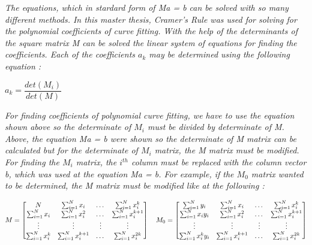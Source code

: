 \emph{\color{blue}The equations, which in stardard form of Ma = b can be solved with so many different methods. In this master thesis, \textit{Cramer's Rule} was used for solving for the polynomial coefficients of curve fitting. With the help of the determinants of the square matrix M can be solved the linear system of equations for finding the coefficients. Each of the coefficients $a_{k}$ may be determined using the following equation :}

\begin{center}
$a_{k} = \dfrac{det(M_{i})}{det(M)}$
\end{center}

\emph{\color{blue}For finding coefficients of polynomial curve fitting, we have to use the equation shown above so the determinate of $ M_{i} $ must be divided by determinate of M. Above, the equation Ma = b were shown so the determinate of M matrix can be calculated but for the determinate of $ M_{i} $ matrix, the M matrix must be modified. For finding the $ M_{i} $ matrix, the $ i^{th} $ column must be replaced with the column vector b, which was used at the equation Ma = b. For example, if the $ M_{0} $ matrix wanted to be determined, the M matrix must be modified like at the following\cite{Curve_Fitting2} :}


\[
 M = \begin{bmatrix}
N & $$\sum_{i=1}^{N} x_{i}$$ & $\dots$ & $$\sum_{i=1}^{N} x_{i}^{k}$$ \\
$$\sum_{i=1}^{N} x_{i}$$ & $$\sum_{i=1}^{N} x_{i}^2$$ & $\dots$ & $$\sum_{i=1}^{N} x_{i}^{k+1}$$ \\
$\vdots$ & $\vdots$ & $\vdots$ & $\vdots$ \\
$$\sum_{i=1}^{N} x_{i}^{k}$$ & $$\sum_{i=1}^{N} x_{i}^{k+1}$$ & $\dots$ & $$\sum_{i=1}^{N} x_{i}^{2k}$$ \\

\end{bmatrix} \quad
 M_{0} = \begin{bmatrix}
$$\sum_{i=1}^{N} y_{i}$$ & $$\sum_{i=1}^{N} x_{i}$$ & $\dots$ & $$\sum_{i=1}^{N} x_{i}^{k}$$ \\
$$\sum_{i=1}^{N} x_{i}y_{i}$$ & $$\sum_{i=1}^{N} x_{i}^2$$ & $\dots$ & $$\sum_{i=1}^{N} x_{i}^{k+1}$$ \\
$\vdots$ & $\vdots$ & $\vdots$ & $\vdots$ \\
$$\sum_{i=1}^{N} x_{i}^{k}y_{i}$$ & $$\sum_{i=1}^{N} x_{i}^{k+1}$$ & $\dots$ & $$\sum_{i=1}^{N} x_{i}^{2k}$$ \\

\end{bmatrix}
\]

